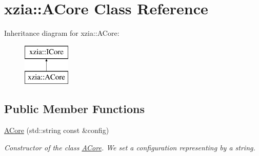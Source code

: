 \hypertarget{classxzia_1_1ACore}{}\section{xzia\+:\+:A\+Core Class Reference}
\label{classxzia_1_1ACore}
Inheritance diagram for xzia\+:\+:A\+Core\+:\begin{figure}[H]
\begin{center}
\leavevmode
\includegraphics[height=2.000000cm]{classxzia_1_1ACore}
\end{center}
\end{figure}
\subsection*{Public Member Functions}
\begin{DoxyCompactItemize}
\item 
\mbox{\hyperlink{classxzia_1_1ACore_a615436a95f788dd92d545e10a1d4b2c3}{A\+Core}} (std\+::string const \&config)
\begin{DoxyCompactList}\small\item\em Constructor of the class \mbox{\hyperlink{classxzia_1_1ACore}{A\+Core}}. We set a configuration representing by a string. \end{DoxyCompactList}\end{DoxyCompactItemize}
